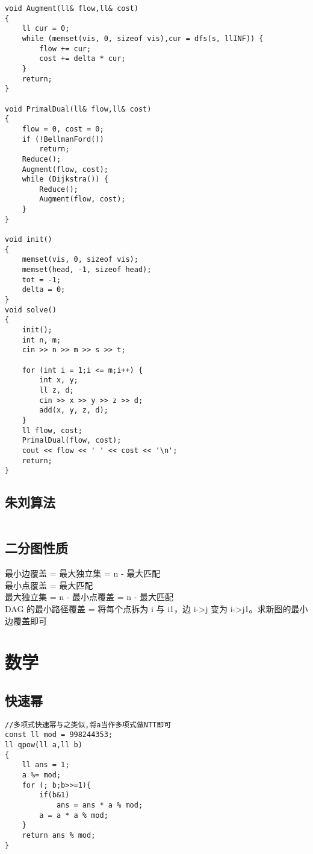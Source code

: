 \documentclass[twocolumn,a4]{article}
\begin{document}
\begin{lstlisting}
void Augment(ll& flow,ll& cost)
{
    ll cur = 0;
    while (memset(vis, 0, sizeof vis),cur = dfs(s, llINF)) {
        flow += cur;
        cost += delta * cur;
    }
    return;
}

void PrimalDual(ll& flow,ll& cost)
{
    flow = 0, cost = 0;
    if (!BellmanFord())
        return;
    Reduce();
    Augment(flow, cost);
    while (Dijkstra()) {
        Reduce();
        Augment(flow, cost);
    }
}

void init()
{
    memset(vis, 0, sizeof vis);
    memset(head, -1, sizeof head);
    tot = -1;
    delta = 0;
}
void solve()
{
    init();
    int n, m;
    cin >> n >> m >> s >> t;

    for (int i = 1;i <= m;i++) {
        int x, y;
        ll z, d;
        cin >> x >> y >> z >> d;
        add(x, y, z, d);
    }
    ll flow, cost;
    PrimalDual(flow, cost);
    cout << flow << ' ' << cost << '\n';
    return;
}
\end{lstlisting}

\subsection{朱刘算法}
\begin{lstlisting}

\end{lstlisting}

\subsection{二分图性质}
最小边覆盖 = 最大独立集 = n - 最大匹配\\
最小点覆盖 = 最大匹配\\
最大独立集 = n - 最小点覆盖 = n - 最大匹配\\
DAG 的最小路径覆盖 = 将每个点拆为 i 与 i1，边 i->j 变为 i->j1。求新图的最小边覆盖即可\\

\section{数学}

\subsection{快速幂}
\begin{lstlisting}
//多项式快速幂与之类似,将a当作多项式做NTT即可
const ll mod = 998244353;
ll qpow(ll a,ll b)
{
    ll ans = 1;
    a %= mod;
    for (; b;b>>=1){
        if(b&1)
            ans = ans * a % mod;
        a = a * a % mod;
    }
    return ans % mod;
}
\end{lstlisting}
\end{document}
